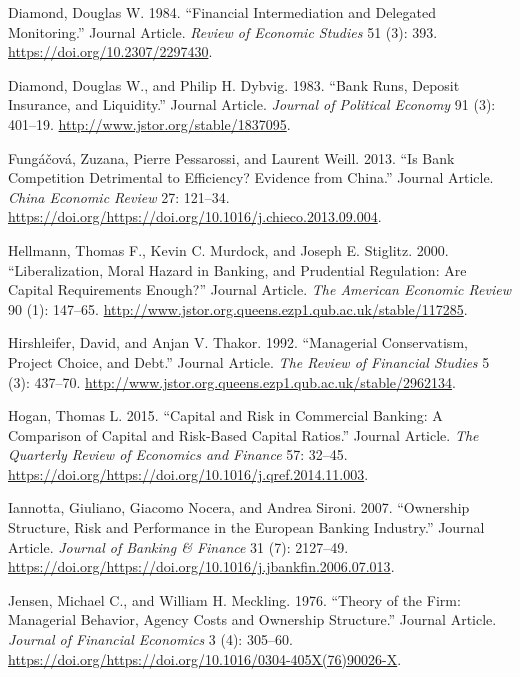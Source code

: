 \documentclass{article}
\begin{document}
\leavevmode\hypertarget{ref-RN45}{}%
Diamond, Douglas W. 1984. ``Financial Intermediation and Delegated
Monitoring.'' Journal Article. \emph{Review of Economic Studies} 51 (3):
393. \url{https://doi.org/10.2307/2297430}.

\leavevmode\hypertarget{ref-RN46}{}%
Diamond, Douglas W., and Philip H. Dybvig. 1983. ``Bank Runs, Deposit
Insurance, and Liquidity.'' Journal Article. \emph{Journal of Political
Economy} 91 (3): 401--19. \url{http://www.jstor.org/stable/1837095}.

\leavevmode\hypertarget{ref-RN47}{}%
Fungáčová, Zuzana, Pierre Pessarossi, and Laurent Weill. 2013. ``Is Bank
Competition Detrimental to Efficiency? Evidence from China.'' Journal
Article. \emph{China Economic Review} 27: 121--34.
\url{https://doi.org/https://doi.org/10.1016/j.chieco.2013.09.004}.

\leavevmode\hypertarget{ref-RN48}{}%
Hellmann, Thomas F., Kevin C. Murdock, and Joseph E. Stiglitz. 2000.
``Liberalization, Moral Hazard in Banking, and Prudential Regulation:
Are Capital Requirements Enough?'' Journal Article. \emph{The American
Economic Review} 90 (1): 147--65.
\url{http://www.jstor.org.queens.ezp1.qub.ac.uk/stable/117285}.

\leavevmode\hypertarget{ref-RN49}{}%
Hirshleifer, David, and Anjan V. Thakor. 1992. ``Managerial
Conservatism, Project Choice, and Debt.'' Journal Article. \emph{The
Review of Financial Studies} 5 (3): 437--70.
\url{http://www.jstor.org.queens.ezp1.qub.ac.uk/stable/2962134}.

\leavevmode\hypertarget{ref-RN50}{}%
Hogan, Thomas L. 2015. ``Capital and Risk in Commercial Banking: A
Comparison of Capital and Risk-Based Capital Ratios.'' Journal Article.
\emph{The Quarterly Review of Economics and Finance} 57: 32--45.
\url{https://doi.org/https://doi.org/10.1016/j.qref.2014.11.003}.

\leavevmode\hypertarget{ref-RN51}{}%
Iannotta, Giuliano, Giacomo Nocera, and Andrea Sironi. 2007. ``Ownership
Structure, Risk and Performance in the European Banking Industry.''
Journal Article. \emph{Journal of Banking \& Finance} 31 (7): 2127--49.
\url{https://doi.org/https://doi.org/10.1016/j.jbankfin.2006.07.013}.

\leavevmode\hypertarget{ref-RN52}{}%
Jensen, Michael C., and William H. Meckling. 1976. ``Theory of the Firm:
Managerial Behavior, Agency Costs and Ownership Structure.'' Journal
Article. \emph{Journal of Financial Economics} 3 (4): 305--60.
\url{https://doi.org/https://doi.org/10.1016/0304-405X(76)90026-X}.
\end{document}
